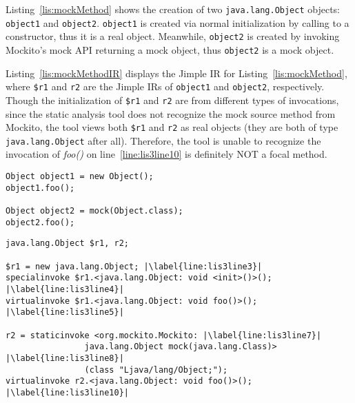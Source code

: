 Listing~\ref{lis:mockMethod} shows the creation of two \texttt{java.lang.Object} objects: \texttt{object1} and \texttt{object2}. \texttt{object1} is created via normal initialization by calling to a constructor, thus it is a real object. Meanwhile, \texttt{object2} is created by invoking Mockito's mock API returning a mock object, thus \texttt{object2} is a mock object.

Listing~\ref{lis:mockMethodIR} displays the Jimple IR for Listing~\ref{lis:mockMethod}, where \texttt{\$r1} and \texttt{r2} are the Jimple IRs of \texttt{object1} and \texttt{object2}, respectively. Though the initialization of \texttt{\$r1} and \texttt{r2} are from different types of invocations, since the static analysis tool does not recognize the mock source method from Mockito, the tool views both \texttt{\$r1} and \texttt{r2} as real objects (they are both of type \texttt{java.lang.Object} after all). Therefore, the tool is unable to recognize the invocation of \textit{foo()} on line~\ref{line:lis3line10} is definitely NOT a focal method.

\begin{lstlisting}[basicstyle=\ttfamily, caption={A toy example illustrates a real object \texttt{object1} and a mock object \texttt{object2}, and their corresponding method invocations of \textit{foo()}.},
basicstyle=\ttfamily, captionpos=b, label=lis:mockMethod, escapechar=|, morekeywords={@Test, specialinvoke, virtualinvoke, staticinvoke}]
Object object1 = new Object();
object1.foo();

Object object2 = mock(Object.class);
object2.foo();
\end{lstlisting}



\begin{lstlisting}[basicstyle=\ttfamily, caption={Jimple Intermediate Representation for the code in Listing~\ref{lis:mockMethod}.},
basicstyle=\ttfamily, captionpos=b, label=lis:mockMethodIR, escapechar=|, morekeywords={@Test, specialinvoke, virtualinvoke, staticinvoke}]
java.lang.Object $r1, r2;

$r1 = new java.lang.Object; |\label{line:lis3line3}|
specialinvoke $r1.<java.lang.Object: void <init>()>(); |\label{line:lis3line4}|
virtualinvoke $r1.<java.lang.Object: void foo()>(); |\label{line:lis3line5}|

r2 = staticinvoke <org.mockito.Mockito: |\label{line:lis3line7}|
				java.lang.Object mock(java.lang.Class)> |\label{line:lis3line8}|
				(class "Ljava/lang/Object;");
virtualinvoke r2.<java.lang.Object: void foo()>(); |\label{line:lis3line10}|
\end{lstlisting}



